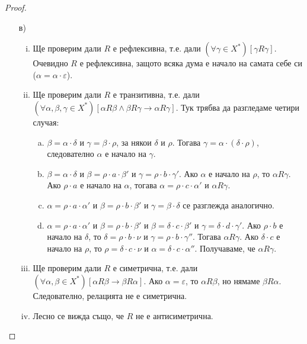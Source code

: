 \documentclass[a4paper]{article}
\begin{document}
\begin{proof}
  \begin{enumerate}[1)]
  \item[в)]
    \begin{enumerate}[(i)]
    \item
      Ще проверим дали $R$ е рефлексивна, т.е. дали $(\forall\gamma\in X^{*})[\gamma R\gamma]$.
      Очевидно $R$ е рефлексивна, защото всяка дума е начало на самата себе си ($\alpha = \alpha\cdot\varepsilon$).
    \item
      Ще проверим дали $R$ е транзитивна, т.е. дали $(\forall\alpha,\beta,\gamma\in X^*)[\alpha R\beta\wedge\beta R\gamma\rightarrow\alpha R\gamma]$.
      Тук трябва да разгледаме четири случая:
      \begin{enumerate}[a)]
      \item
        $\beta = \alpha\cdot\delta$ и $\gamma = \beta\cdot\rho$, за някои $\delta$ и $\rho$.
        Тогава $\gamma = \alpha\cdot(\delta\cdot\rho)$, следователно $\alpha$ е начало на $\gamma$.
      \item
        $\beta = \alpha\cdot\delta$ и $\beta = \rho\cdot a\cdot \beta'$ и $\gamma = \rho\cdot b\cdot\gamma'$.
        Ако $\alpha$ е начало на $\rho$, то $\alpha R \gamma$.
        Ако $\rho\cdot a$ е начало на $\alpha$, тогава $\alpha = \rho\cdot c\cdot\alpha'$ и $\alpha R \gamma$.
      \item
        $\alpha = \rho\cdot a\cdot \alpha'$ и $\beta = \rho\cdot b\cdot\beta'$ и $\gamma = \beta\cdot\delta$ се разглежда аналогично.
      \item
        $\alpha = \rho\cdot a\cdot \alpha'$ и $\beta = \rho\cdot b\cdot\beta'$ и $\beta = \delta\cdot c\cdot \beta'$ и $\gamma = \delta\cdot d\cdot\gamma'$.
        Ако $\rho\cdot b$ е начало на $\delta$, то $\delta = \rho\cdot b\cdot\nu$ и $\gamma = \rho\cdot b\cdot \gamma''$. Тогава $\alpha R \gamma$.
        Ако $\delta\cdot c$ е начало на $\rho$, то $\rho = \delta\cdot c\cdot\nu$ и $\alpha = \delta\cdot c\cdot\alpha''$. Получаваме, че 
        $\alpha R \gamma$.
      \end{enumerate}
    \item
      Ще проверим дали $R$ е симетрична, т.е. дали $(\forall\alpha,\beta\in X^*)[\alpha R\beta \rightarrow \beta R\alpha]$.
      Ако $\alpha = \varepsilon$, то $\alpha R\beta$, но нямаме $\beta R\alpha$.
      Следователно, релацията не е симетрична.
    \item
      Лесно се вижда също, че $R$ не е антисиметрична.
    \end{enumerate}
    
  \end{enumerate}
  
\end{proof}
\end{document}
